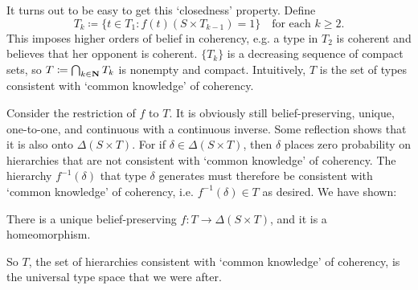 \documentclass[11pt,letterpaper,reqno,oneside]{article}
\begin{document}
It turns out to be easy to get this `closedness' property. Define
%
\begin{equation*}
	T_k \coloneqq \{ t \in T_1 : f(t)( S \times T_{k-1} ) = 1 \}
	\quad\text{for each $k \geq 2$} .
\end{equation*}
%
This imposes higher orders of belief in coherency, e.g. a type in $T_2$ is coherent and believes that her opponent is coherent. $\{ T_k \}$ is a decreasing sequence of compact sets, so $T \coloneqq \bigcap_{k \in \mathbf{N}} T_k$ is nonempty and compact. Intuitively, $T$ is the set of types consistent with `common knowledge' of coherency.

Consider the restriction of $f$ to $T$. It is obviously still belief-preserving, unique, one-to-one, and continuous with a continuous inverse. Some reflection shows that it is also onto $\Delta( S \times T )$. For if $\delta \in \Delta( S \times T )$, then $\delta$ places zero probability on hierarchies that are not consistent with `common knowledge' of coherency. The hierarchy $f^{-1}(\delta)$ that type $\delta$ generates must therefore be consistent with `common knowledge' of coherency, i.e. $f^{-1}(\delta) \in T$ as desired. We have shown:
%
\begin{proposition}
	\label{proposition:BD93_2}
	There is a unique belief-preserving $f : T \to \Delta( S \times T )$, and it is a homeomorphism.
\end{proposition}
%
\noindent So $T$, the set of hierarchies consistent with `common knowledge' of coherency, is the universal type space that we were after.
\end{document}
